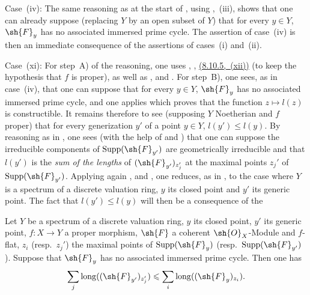 \begin{env}[12.2.1.2]
\label{IV.12.2.1.2}
Case~(iv): The same reasoning as at the start of , using ,~(iii), shows that one can already suppose (replacing $Y$ by an open subset of $Y$) that for every $y\in Y$, $\sh{F}_y$ has no associated immersed prime cycle.
The assertion of case~(iv) is then an immediate consequence of the assertions of cases~(i) and~(ii).
\end{env}

\begin{env}[12.2.1.3]
\label{IV.12.2.1.3}
Case~(xi): For step~A) of the reasoning, one uses , , \hyperref[IV.8.10.5]{(8.10.5,~(xii))} (to keep the hypothesis that $f$ is proper), as well as ,  and .
For step~B), one sees, as in case~(iv), that one can suppose that for every $y\in Y$, $\sh{F}_y$ has no associated immersed prime cycle, and one applies  which proves that the function $z\mapsto l(z)$ is constructible.
It remains therefore to see (supposing $Y$ Noetherian and $f$ proper) that for every generization $y'$ of a point $y\in Y$, $l(y')\leqslant l(y)$.
By reasoning as in , one sees (with the help of  and ) that one can suppose the irreducible components of $\operatorname{Supp}(\sh{F}_{y'})$ are geometrically irreducible and that $l(y')$ is the \emph{sum of the lengths} of $(\sh{F}_{y'})_{z_j'}$ at the maximal points $z_j'$ of $\operatorname{Supp}(\sh{F}_{y'})$.
Applying again ,  and , one reduces, as in , to the case where $Y$ is a spectrum of a discrete valuation ring, $y$ its closed point and $y'$ its generic point.
The fact that $l(y')\leqslant l(y)$ will then be a consequence of the

\begin{lemma}[12.2.1.4]
\label{IV.12.2.1.4}
Let $Y$ be a spectrum of a discrete valuation ring, $y$ its closed point, $y'$ its generic point, $f:X\to Y$ a proper morphism, $\sh{F}$ a coherent $\sh{O}_X$-Module and $f$-flat, $z_i$ \textnormal{(}resp.\ $z_j'$\textnormal{)} the maximal points of $\operatorname{Supp}(\sh{F}_y)$ \textnormal{(}resp.\ $\operatorname{Supp}(\sh{F}_{y'})$\textnormal{)}.
Suppose that $\sh{F}_y$ has no associated immersed prime cycle.
Then one has
\[
  \sum_j \operatorname{long}((\sh{F}_{y'})_{z_j'}) \leqslant \sum_i \operatorname{long}((\sh{F}_y)_{z_i}).
\]
\end{lemma}


\end{env}
